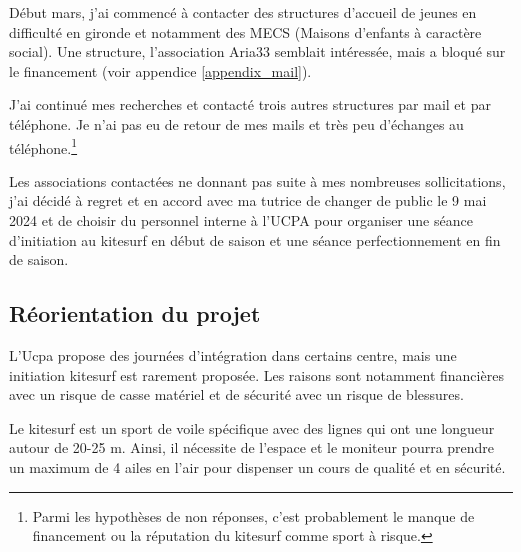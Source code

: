 \documentclass[11pt,a4paper]{report}
\begin{document}
Début mars, j'ai commencé à contacter des structures d'accueil de jeunes 
en difficulté en gironde et notamment des MECS (Maisons d'enfants à
caractère social).
Une structure, l'association Aria33\cite{aria33} semblait 
intéressée, mais a bloqué sur le financement
(voir appendice \ref{appendix_mail}).

J'ai continué mes recherches et contacté trois autres structures
par mail et par téléphone. Je n'ai pas eu de retour de mes mails 
et très peu d'échanges au téléphone.\footnote{Parmi les hypothèses
de non réponses, c'est probablement le manque de financement ou
la réputation du kitesurf comme sport  à risque.}

Les associations contactées ne donnant pas  suite à mes nombreuses
sollicitations, j'ai décidé à regret et en accord avec ma tutrice
de changer de public le 9 mai 2024 et de choisir du personnel interne
à l'UCPA pour organiser une séance d'initiation au kitesurf en début 
de saison et une séance perfectionnement en fin de saison.

\subsection{Réorientation du projet\label{reorientation}}

L'Ucpa propose des journées d'intégration dans certains centre, mais
une initiation kitesurf est rarement proposée. Les raisons sont notamment
financières avec un risque de casse matériel et de sécurité avec un risque
de blessures.

Le kitesurf est un sport de voile spécifique avec des lignes  qui ont
une longueur autour de  20-25 m. Ainsi, il nécessite de l'espace
et le moniteur pourra prendre un maximum de 4 ailes en l'air
pour dispenser un cours de qualité et en sécurité. 
\end{document}
